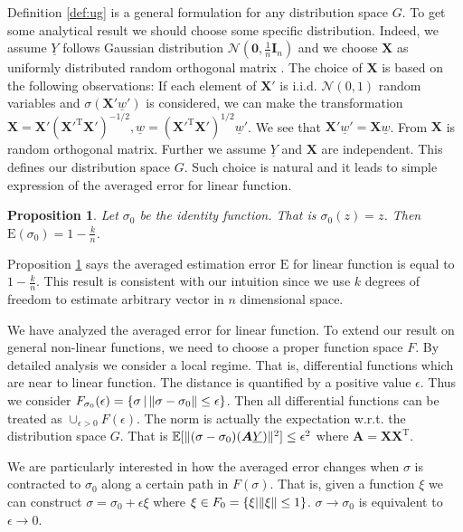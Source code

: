 \documentclass[conference]{IEEEtran}
\newtheorem{proposition}{Proposition}
\DeclarePairedDelimiter\norm{\lVert}{\rVert}
\def\E{\mathbb{E}}
\def\T{\mathrm{T}}
\begin{document}
Definition \ref{def:ug} is a general formulation for any distribution space $G$.
To get some analytical result we should choose some specific distribution.
Indeed, we assume $\underline{Y}$ follows Gaussian distribution $\mathcal{N}(\mathbf{0},\frac{1}{n} \mathbf{I}_n)$ and
we choose $\bm{X}$ as uniformly distributed random orthogonal matrix \cite{eaton1989group}. The choice of $\bm{X}$ is based on the following observations: If each element of $\bm{X}'$ is i.i.d. $\mathcal{N}(0, 1)$ random variables and $\sigma(\bm{X}'\underline{w}')$ is considered, we can make the transformation $\bm{X} = \bm{X}'(\bm{X}'^\T\bm{X}')^{-1/2}, \underline{w} = (\bm{X}'^\T\bm{X}')^{1/2}\underline{w}'$. We see that $\bm{X}'\underline{w}' = \bm{X}\underline{w}$. From \cite[Proposition 7.1]{eaton1989group} $\bm{X}$ is random orthogonal matrix.
Further we assume $\underline{Y}$ and $\bm{X}$ are independent.
This defines our distribution space $G$. Such choice is natural and it leads to simple expression of the averaged error for linear function.

\begin{proposition}\label{prop:linear}
Let $\sigma_0$ be the identity function. That is $\sigma_0(z) = z$. Then $\mathrm{E}(\sigma_0) = 1 - \frac{k}{n}$.\end{proposition}

Proposition \ref{prop:linear} says the averaged estimation error $\mathrm{E}$ for linear function is equal to $1-\frac{k}{n}$.
This result is consistent with our intuition
since we use $k$ degrees of freedom to estimate arbitrary vector in $n$ dimensional space.



We have analyzed the averaged error for linear function. To extend our result on general non-linear functions, we need to choose a proper function space $F$. By detailed analysis we consider a local regime. That is, differential functions which are near to linear function. The distance is quantified by a positive value $\epsilon$. Thus we consider $F_{\sigma_0}(\epsilon) =\{ \sigma \,|\, \norm{\sigma - \sigma_0} \leq \epsilon\}$. Then all differential functions can be treated as $\cup_{\epsilon>0} F(\epsilon)$. The norm is actually the expectation w.r.t. the distribution space $G$. That is $\E[\norm{(\sigma - \sigma_0)(\bm{A}\underline{Y})}^2] \leq \epsilon^2$
where $\bm{A} = \bm{X}\bm{X}^\T$.


We are particularly interested in how the averaged error changes when $\sigma$ is contracted to $\sigma_0$ along a certain path in $F(\sigma)$. That is, given a function $\xi$ we can construct $\sigma = \sigma_0 + \epsilon \xi$ where $\xi \in F_0 = \{\xi | \norm{\xi} \leq 1 \}$. $\sigma \to \sigma_0$ is equivalent to $\epsilon \to 0$.
\end{document}
